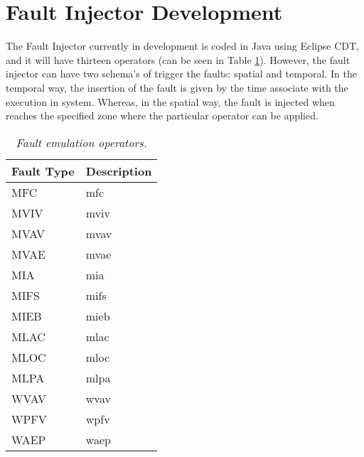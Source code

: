 \newpage
\section{Fault Injector Development}

The Fault Injector currently in development is coded in Java using Eclipse CDT, and it will have thirteen operators (can be seen in Table \ref{tab:faultEmulationOperators})\cite{duraes2005thesis}. However, the fault injector can have two schema's of trigger the faults: spatial and temporal. In the temporal way, the insertion of the fault is given by the time associate with the execution in system. Whereas, in the spatial way, the fault is injected when reaches the specified zone where the particular operator can be applied.

\begin{table}[!ht]
\begin{tabular}{|l|p{12cm}|}
\hline
\textbf{Fault Type}		& \multicolumn{1}{c|}{\textbf{Description}}		\\ \hline \hline
MFC        				& \Acl{mfc}  									\\ \hline
MVIV       				& \Acl{mviv} 									\\ \hline
MVAV       				& \Acl{mvav} 									\\ \hline
MVAE       				& \Acl{mvae} 									\\ \hline
MIA        				& \Acl{mia}  									\\ \hline
MIFS       				& \Acl{mifs} 									\\ \hline
MIEB       				& \Acl{mieb} 									\\ \hline
MLAC       				& \Acl{mlac} 									\\ \hline
MLOC       				& \Acl{mloc} 									\\ \hline
MLPA       				& \Acl{mlpa} 									\\ \hline
WVAV       				& \Acl{wvav} 									\\ \hline
WPFV       				& \Acl{wpfv} 									\\ \hline
WAEP       				& \Acl{waep} 									\\ \hline
\end{tabular}
\caption{\small \sl Fault emulation operators.\label{tab:faultEmulationOperators}}
\end{table}

